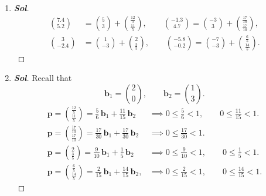 \begin{enumerate}
\begin{proof}[\normalfont\color{magenta}\bfseries Sol]
\begin{enumerate}
\begin{center}
		\end{center}
	\end{enumerate}
\end{proof}
	\item \begin{proof}[\normalfont\color{magenta}\bfseries Sol]
		\[
		\boxed{
			\begin{aligned}
				\binom{7.4}{5.2}&=\binom{5}{3}+\binom{\frac{12}{5}}{\frac{11}{5}},\qquad
				\binom{-1.3}{4.7}=\binom{-3}{3}+\binom{\frac{17}{10}}{\frac{17}{10}},\\[6pt]
				\binom{3}{-2.4}&=\binom{1}{-3}+\binom{2}{\frac35},\qquad
				\binom{-5.8}{-0.2}=\binom{-7}{-3}+\binom{\frac65}{\frac{14}{5}}.
			\end{aligned}
		}
		\]
	\end{proof}
	\item \begin{proof}[\normalfont\color{magenta}\bfseries Sol]
		Recall that
		\[
		\mathbf b_1=\binom20,
		\qquad
		\mathbf b_2=\binom13.
		\]
		\begin{align*}		
			\mathbf p=
			\binom{\frac{12}{5}}{\frac{11}{5}}=
			\frac56\,\mathbf b_1+\frac{11}{15}\,\mathbf b_2&\implies
			0\le \frac56<1,\qquad 0\le \frac{11}{15}<1.\\
			\mathbf p=
			\binom{\frac{17}{10}}{\frac{17}{10}}=
			\frac{17}{30}\,\mathbf b_1+\frac{17}{30}\,\mathbf b_2&\implies
			0\le \frac{17}{30}<1.\\
			\mathbf p=
			\binom{2}{\frac35}=
			\frac9{10}\,\mathbf b_1+\frac15\,\mathbf b_2&\implies
				0\le \frac9{10}<1,
			\qquad
			0\le \frac15<1.\\	\mathbf p=\binom{\frac65}{\frac{14}{5}}=
			\frac2{15}\,\mathbf b_1+\frac{14}{15}\,\mathbf b_2,&\implies
				0\le \frac2{15}<1,\qquad 0\le \frac{14}{15}<1.
		\end{align*}
	\end{proof}
\end{enumerate}

